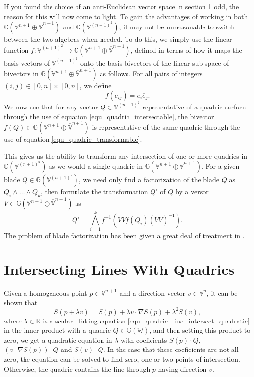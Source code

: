 \documentclass{birkjour}
\theoremstyle{definition}
\theoremstyle{remark}
\numberwithin{equation}{section}
\newcommand{\G}{\mathbb{G}}
\newcommand{\V}{\mathbb{V}}
\newcommand{\Vb}{\mathbb{\overline{V}}}
\newcommand{\W}{\mathbb{W}}
\newcommand{\R}{\mathbb{R}}
\begin{document}

If you found the choice of an anti-Euclidean vector
space in section \ref{} odd, the reason for this will
now come to light.  To gain the advantages of working
in both $\G(\V^{n+1}\oplus\Vb^{n+1})$ and $\G(\V^{(n+1)^2})$,
it may not be unreasonable to switch between the two
algebras when needed.  To do this, we simply use the linear
function $f:\V^{(n+1)^2}\to\G(\V^{n+1}\oplus\Vb^{n+1})$,
defined in terms of how it maps the basis vectors of $\V^{(n+1)^2}$ onto the
basis bivectors of the linear sub-space of bivectors in $\G(\V^{n+1}\oplus\Vb^{n+1})$ as follows.
For all pairs of integers $(i,j)\in[0,n]\times[0,n]$, we define
\begin{equation}
f(e_{ij})=e_i\overline{e}_j.
\end{equation}
We now see that for any vector $Q\in\V^{(n+1)^2}$ representative of
a quadric surface through the use of equation \eqref{equ_quadric_intersectable}, the bivector
$f(Q)\in\G(\V^{n+1}\oplus\Vb^{n+1})$ is representative of the same
quadric through the use of equation \eqref{equ_quadric_transformable}.

This gives us the ability to transform any intersection of one or more quadrics
in $\G(\V^{(n+1)^2})$ as we would a single quadric in $\G(\V^{n+1}\oplus\Vb^{n+1})$.
For a given blade $Q\in\G(\V^{(n+1)^2})$, we need only find a factorization
of the blade $Q$ as $Q_i\wedge\dots\wedge Q_k$, then formulate the transformation $Q'$
of $Q$ by a versor $V\in\G(\V^{n+1}\oplus\Vb^{n+1})$ as
\begin{equation}
Q' = \bigwedge_{i=1}^k f^{-1}\left(V\overline{V}f(Q_i)(V\overline{V})^{-1}\right).
\end{equation}
The problem of blade factorization has been given a great deal of treatment in \cite{}.

\section{Intersecting Lines With Quadrics}

Given a homogeneous point $p\in\V^{n+1}$ and a direction vector $v\in\V^n$,
it can be shown that
\begin{equation}\label{equ_quadric_line_intersect_quadratic}
S(p+\lambda v) = S(p)+\lambda v\cdot\nabla S(p)+\lambda^2 S(v),
\end{equation}
where $\lambda\in\R$ is a scalar.  Taking equation \eqref{equ_quadric_line_intersect_quadratic} in the
inner product with a quadric $Q\in\G(\W)$, and then setting this
product to zero, we get a quadratic equation in $\lambda$ with
coeficients $S(p)\cdot Q$, $(v\cdot\nabla S(p))\cdot Q$ and $S(v)\cdot Q$.
In the case that these coeficients are not all zero, the equation can be
solved to find zero, one or two points of intersection.  Otherwise, the quadric
contains the line through $p$ having direction $v$.
\end{document}
